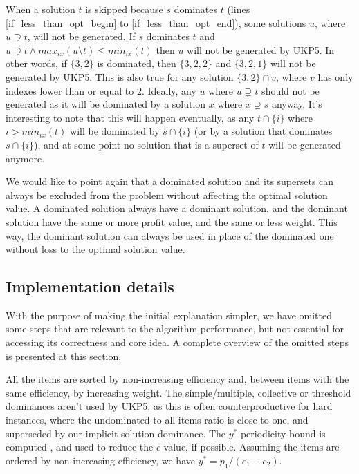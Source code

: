 \documentclass[runningheads,a4paper]{llncs}
\begin{document}
When a solution \(t\) is skipped because \(s\) dominates \(t\) (lines \ref{if_less_than_opt_begin} to \ref{if_less_than_opt_end}), some solutions \(u\), where \(u \supsetneq t\), will not be generated. If \(s\) dominates \(t\) and \(u \supsetneq t \land max_{ix}(u\setminus t) \leq min_{ix}(t)\) then \(u\) will not be generated by UKP5. In other words, if \(\{3, 2\}\) is dominated, then \(\{3, 2, 2\}\) and \(\{3, 2, 1\}\) will not be generated by UKP5. This is also true for any solution \(\{3, 2\} \cap v\), where \(v\) has only indexes lower than or equal to \(2\). Ideally, any \(u\) where \(u \supsetneq t\) should not be generated as it will be dominated by a solution \(x\) where \(x \supsetneq s\) anyway. It's interesting to note that this will happen eventually, as any \(t \cap \{i\}\) where \(i > min_{ix}(t)\) will be dominated by \(s \cap \{i\}\) (or by a solution that dominates \(s \cap \{i\}\)), and at some point no solution that is a superset of \(t\) will be generated anymore.

We would like to point again that a dominated solution and its supersets can always be excluded from the problem without affecting the optimal solution value. A dominated solution always have a dominant solution, and the dominant solution have the same or more profit value, and the same or less weight. This way, the dominant solution can always be used in place of the dominated one without loss to the optimal solution value. 

\subsection{Implementation details}

With the purpose of making the initial explanation simpler, we have omitted some steps that are relevant to the algorithm performance, but not essential for accessing its correctness and core idea. A complete overview of the omitted steps is presented at this section.

All the items are sorted by non-increasing efficiency and, between items with the same efficiency, by increasing weight. The simple/multiple, collective or threshold dominances aren't used by UKP5, as this is often counterproductive for hard instances, where the undominated-to-all-items ratio is close to one, and superseded by our implicit solution dominance. The \(y^{*}\) periodicity bound is computed \cite[p. 223]{gar72}, and used to reduce the \(c\) value, if possible. Assuming the items are ordered by non-increasing efficiency, we have \(y^{*} = p_1 / (e_1 - e_2)\).
\end{document}
